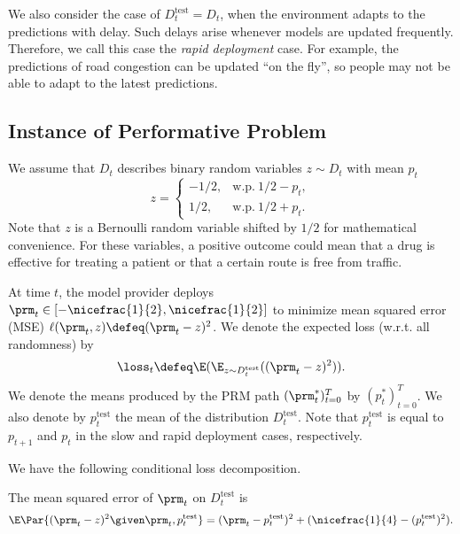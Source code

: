We also consider the case of $D_t^\text{test} = D_t$, when the environment
adapts to the predictions with delay. Such delays arise whenever models
are updated frequently. Therefore, we call this case the \emph{rapid
deployment} case. For example, the predictions of road congestion can be
updated ``on the fly'', so people may not be able to adapt to the latest
predictions.

\subsection{Instance of Performative Problem}
\label{subsec:perf_shift_model}

 We assume that $D_t$ describes binary random variables $z \sim D_t$ with mean
$p_t$
\[
    z =
    \begin{cases}
        -1/2, & \text{w.p.} \: 1/2-p_t,\\
        1/2, & \text{w.p.} \: 1/2+p_t.
    \end{cases}
\]
Note that $z$ is a Bernoulli random variable shifted by $1/2$ for mathematical
convenience. For these variables, a positive outcome could mean that a drug is
effective for treating a patient or that a certain route is free from traffic.

 At time $t$, the model provider deploys $\prm_t \in [-\nicefrac{1}{2},
\nicefrac{1}{2}]$ to minimize mean squared error (MSE) $\ell(\prm_t, z) \defeq
(\prm_t - z)^2$. We denote the expected loss (w.r.t. all randomness) by
\[
    \loss_t \defeq \E(\E_{z \sim D^\text{test}_t}((\prm_t - z)^2)).
\]
We denote the means produced by the PRM path $(\prm^*_t)_{t=0}^{T}$ by $(p^*_t)_{t=0}^T$. We also denote by $p^\text{test}_t$ the mean of the distribution $D^\text{test}_t$. Note that $p^\text{test}_t$ is equal to $p_{t+1}$ and $p_t$ in the slow and
rapid deployment cases, respectively.

We have the following conditional loss decomposition.

\begin{lemma}
    \label{lemma: bias-variance}
    The mean squared error of $\prm_t$ on $D^{\text{test}}_t$ is
    \begin{equation}
        \label{eq:mse}
        \E\Par{(\prm_t - z)^2 \given \prm_t, p^\text{test}_t} = (\prm_t -
        p^\text{test}_t)^2 + (\nicefrac{1}{4} - (p^\text{test}_t)^2).
    \end{equation}
\end{lemma}

